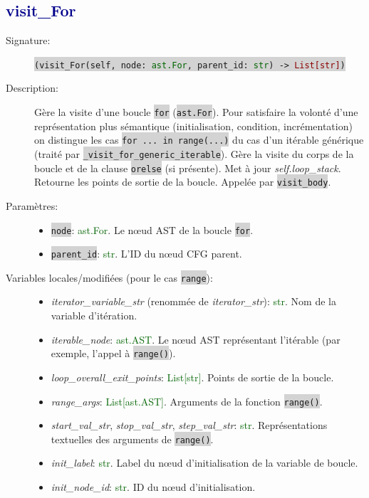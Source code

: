 \documentclass[11pt,a4paper]{article}
\newcommand{\code}[1]{\colorbox{lightgray}{\texttt{\small #1}}}
\newcommand{\var}[1]{\textit{#1}}
\newcommand{\vartype}[1]{\textcolor{darkgreen}{#1}}
\newcommand{\methodname}[1]{\textbf{\textcolor{darkblue}{#1}}}
\newcommand{\param}[1]{\code{#1}}
\newcommand{\rettype}[1]{\textcolor{darkred}{#1}}
\begin{document}
\subsection*{\methodname{visit\_For}}
\begin{description}
    \item[Signature:] \code{(visit\_For(self, node: \vartype{ast.For}, parent\_id: \vartype{str}) -> \rettype{List[str]})}
    \item[Description:] Gère la visite d'une boucle \code{for} (\code{ast.For}). Pour satisfaire la volonté d'une représentation plus sémantique (initialisation, condition, incrémentation) on distingue les cas \code{for ... in range(...)} du cas d'un itérable générique (traité par \code{\_visit\_for\_generic\_iterable}). Gère la visite du corps de la boucle et de la clause \code{orelse} (si présente). Met à jour \var{self.loop\_stack}. Retourne les points de sortie de la boucle. Appelée par \code{visit\_body}.
    \item[Paramètres:]
    \begin{itemize}
        \item \param{node}: \vartype{ast.For}. Le nœud AST de la boucle \code{for}.
        \item \param{parent\_id}: \vartype{str}. L'ID du nœud CFG parent.
    \end{itemize}
    \item[Variables locales/modifiées (pour le cas \code{range}):]
    \begin{itemize}
        \item \var{iterator\_variable\_str} (renommée de \var{iterator\_str}): \vartype{str}. Nom de la variable d'itération.
        \item \var{iterable\_node}: \vartype{ast.AST}. Le nœud AST représentant l'itérable (par exemple, l'appel à \code{range()}).
        \item \var{loop\_overall\_exit\_points}: \vartype{List[str]}. Points de sortie de la boucle.
        \item \var{range\_args}: \vartype{List[ast.AST]}. Arguments de la fonction \code{range()}.
        \item \var{start\_val\_str}, \var{stop\_val\_str}, \var{step\_val\_str}: \vartype{str}. Représentations textuelles des arguments de \code{range()}.
        \item \var{init\_label}: \vartype{str}. Label du nœud d'initialisation de la variable de boucle.
        \item \var{init\_node\_id}: \vartype{str}. ID du nœud d'initialisation.

\end{itemize}
\end{description}
\end{document}
